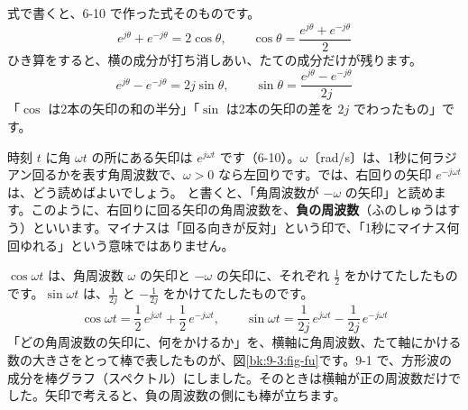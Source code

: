 式で書くと、6-10 で作った式そのものです。
\[ e^{j\theta}+e^{-j\theta}=2\cos\theta,\qquad \cos\theta=\frac{e^{j\theta}+e^{-j\theta}}{2} \]
ひき算をすると、横の成分が打ち消しあい、たての成分だけが残ります。
\[ e^{j\theta}-e^{-j\theta}=2j\sin\theta,\qquad \sin\theta=\frac{e^{j\theta}-e^{-j\theta}}{2j} \]
「$\cos$ は2本の矢印の和の半分」「$\sin$ は2本の矢印の差を $2j$ でわったもの」です。


\label{bk:9-3:fu}時刻 $t$ に角 $\omega t$ の所にある矢印は $e^{j\omega t}$ です（6-10）。$\omega$〔rad/s〕は、1秒に何ラジアン回るかを表す角周波数で、$\omega>0$ なら左回りです。では、右回りの矢印 $e^{-j\omega t}$ は、どう読めばよいでしょう。
と書くと、「角周波数が $-\omega$ の矢印」と読めます。このように、右回りに回る矢印の角周波数を、\textbf{負の周波数}（ふのしゅうはすう）といいます。マイナスは「回る向きが反対」という印で、「1秒にマイナス何回ゆれる」という意味ではありません。

$\cos\omega t$ は、角周波数 $\omega$ の矢印と $-\omega$ の矢印に、それぞれ $\frac12$ をかけてたしたものです。$\sin\omega t$ は、$\frac{1}{2j}$ と $-\frac{1}{2j}$ をかけてたしたものです。
\[ \cos\omega t=\frac12\,e^{j\omega t}+\frac12\,e^{-j\omega t},\qquad \sin\omega t=\frac{1}{2j}\,e^{j\omega t}-\frac{1}{2j}\,e^{-j\omega t} \]
「どの角周波数の矢印に、何をかけるか」を、横軸に角周波数、たて軸にかける数の大きさをとって棒で表したものが、図\ref{bk:9-3:fig-fu}です。9-1 で、方形波の成分を棒グラフ（スペクトル）にしました。そのときは横軸が正の周波数だけでした。矢印で考えると、負の周波数の側にも棒が立ちます。

